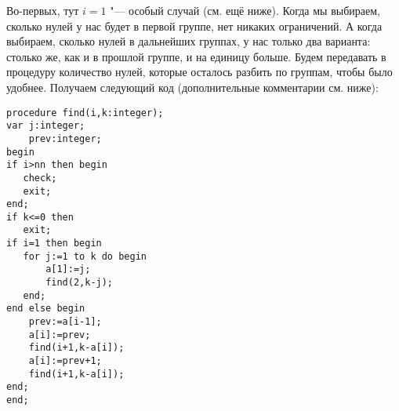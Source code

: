 Во-первых, тут $i=1$ "--- особый случай (см. ещё ниже). Когда мы выбираем, сколько нулей у нас 
будет в первой группе, нет никаких ограничений. А когда выбираем, сколько нулей 
в дальнейших группах, у нас только два варианта: столько же, как и в прошлой 
группе, и на единицу больше. Будем передавать в процедуру количество нулей, 
которые осталось разбить по группам, чтобы было удобнее.
Получаем следующий код (дополнительные комментарии см. ниже):

\begin{codesample}\begin{verbatim}
procedure find(i,k:integer); 
var j:integer;
    prev:integer;
begin
if i>nn then begin
   check;
   exit;
end;
if k<=0 then 
   exit;
if i=1 then begin
   for j:=1 to k do begin
       a[1]:=j;
       find(2,k-j);
   end;
end else begin
    prev:=a[i-1]; 
    a[i]:=prev;
    find(i+1,k-a[i]);
    a[i]:=prev+1;
    find(i+1,k-a[i]);
end;
end;
\end{verbatim}\end{codesample}

